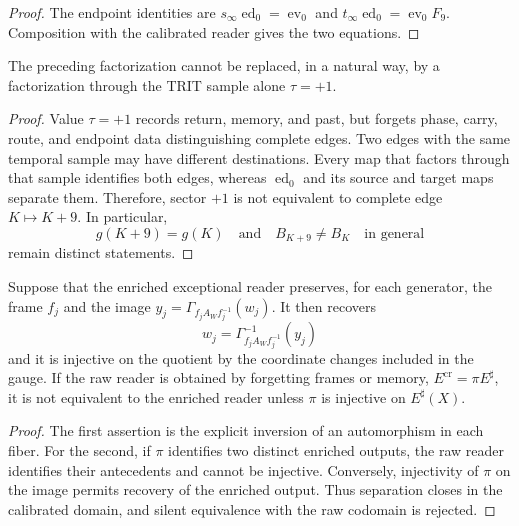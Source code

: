 \begin{proof}
The endpoint identities are
\(s_\infty\operatorname{ed}_0=\operatorname{ev}_0\) and
\(t_\infty\operatorname{ed}_0=\operatorname{ev}_0F_9\). Composition with
the calibrated reader gives the two equations.
\end{proof}

\begin{corollary}
\label{cor:hmt-final-no-equivalencia-retorno-gamma}
The preceding factorization cannot be replaced, in a natural way, by a
factorization through the TRIT sample alone \(\tau=+1\).
\end{corollary}

\begin{proof}
Value \(\tau=+1\) records return, memory, and past, but forgets phase,
carry, route, and endpoint data distinguishing complete edges. Two edges
with the same temporal sample may have different destinations. Every map that
factors through that sample identifies both edges, whereas
\(\operatorname{ed}_0\) and its source and target maps separate them. Therefore,
sector \(+1\) is not equivalent to complete edge \(K\mapsto K+9\).
In particular,
\[
 g(K+9)=g(K)
 \quad\text{and}\quad
 B_{K+9}\ne B_K\quad\text{in general}
\]
remain distinct statements.
\end{proof}

\begin{proposition}
\label{prop:hmt-final-separacion-enriquecida-no-cruda}
Suppose that the enriched exceptional reader preserves, for each
generator, the frame \(f_j\) and the image
\(y_j=\Gamma_{f_jA_Wf_j^{-1}}(w_j)\). It then recovers
\[
 w_j=\Gamma_{f_jA_Wf_j^{-1}}^{-1}(y_j)
\]
and it is injective on the quotient by the coordinate changes included in the
gauge. If the raw reader is obtained by forgetting frames or memory,
\(E^{\mathrm{cr}}=\pi E^{\sharp}\), it is not equivalent to the enriched reader
unless \(\pi\) is injective on \(E^{\sharp}(X)\).
\end{proposition}

\begin{proof}
The first assertion is the explicit inversion of an automorphism in each
fiber. For the second, if \(\pi\) identifies two distinct enriched
outputs, the raw reader identifies their antecedents and cannot be
injective. Conversely, injectivity of \(\pi\) on the image permits
recovery of the enriched output. Thus separation closes in the calibrated
domain, and silent equivalence with the raw codomain is rejected.
\end{proof}

